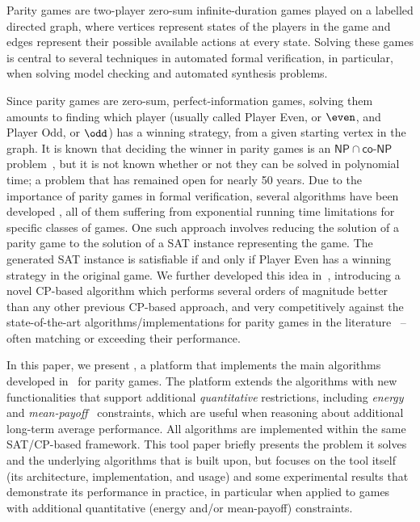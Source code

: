 \documentclass[runningheads]{llncs}
\begin{document}
Parity games are two-player zero-sum infinite-duration games played on a labelled directed graph, where vertices represent states of the players in the game and edges represent their possible available actions at every state. 
Solving these games is central to several techniques in automated formal verification, in particular, when solving model checking and automated synthesis problems.

Since parity games are zero-sum, perfect-information games, solving them amounts to finding which player (usually called Player Even, or $\even$, and Player Odd, or $\odd$) has a winning strategy, from a given starting vertex in the graph. 
It is known that deciding the winner in parity games is an $\mathsf{NP} \cap \mathsf{co\textit{-}NP}$ problem~\cite{Jurdziński:1998}, but it is not known whether or not they can be solved in polynomial time; a problem that has remained open for nearly 50 years. 
Due to the importance of parity games in formal verification, several algorithms have been developed \cite{Aggarwal:2023,Benerecetti:2025,Jurdziński:2000,Jurdziński:2022,Zielonka:1998}, all of them suffering from exponential running time limitations for specific classes of games. 
One such approach involves reducing the solution of a parity game to the solution of a SAT instance representing the game. The generated SAT instance is satisfiable if and only if Player Even has a winning strategy in the original game. 
We further developed this idea in~\cite{Hernandez:2026:noc}, introducing a novel CP-based algorithm which performs several orders of magnitude better than any other previous CP-based approach, and very competitively against the state-of-the-art algorithms/implementations for parity games in the literature~\cite{vanDijk:2018,Benerecetti:2025,Aggarwal:2023} -- often matching or exceeding their performance. 

In this paper, we present \nocq, a platform that implements the main algorithms developed in~\cite{Hernandez:2026:noc} for parity games. The platform extends the algorithms with new functionalities that support additional {\em quantitative} restrictions, including {\em energy}~\cite{ChatterjeeD12} and {\em mean-payoff}~\cite{ChatterjeeHS17} constraints, which are useful when reasoning about additional long-term average performance. All algorithms are implemented within the same SAT/CP-based framework. This tool paper briefly presents the problem it solves and the underlying algorithms that \nocq is built upon, but focuses on the tool itself (its architecture, implementation, and usage) and some experimental results that demonstrate its performance in practice, in particular when applied to games with additional quantitative (energy and/or mean-payoff) constraints. 
\end{document}
